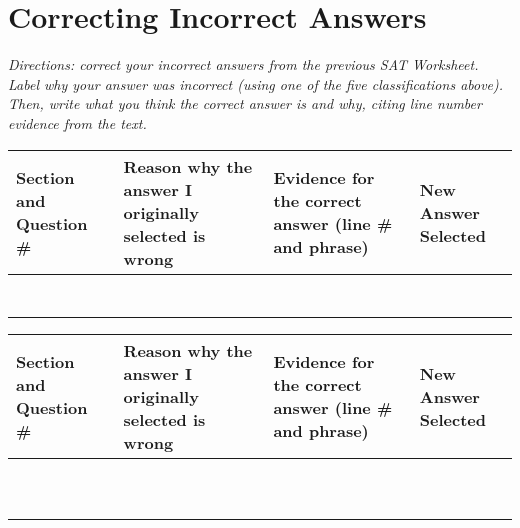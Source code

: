 \section{Correcting Incorrect Answers}

\textit{Directions: correct your incorrect answers from the previous SAT Worksheet. Label why your answer
was incorrect (using one of the five classifications above). Then, write what you think the correct
answer is and why, citing line number evidence from the text.}

\bigskip
\begin{tabularx}{\textwidth}{|X|p{2in}|p{2in}|X|}\hline
Section and Question \# & Reason why the answer I originally selected is wrong & Evidence for the correct answer (line \# and phrase) & New Answer Selected\\\hline
& & &\\[2ex]\hline
& & &\\[2ex]\hline
& & &\\[2ex]\hline
& & &\\[2ex]\hline
& & &\\[2ex]\hline
& & &\\[2ex]\hline
& & &\\[2ex]\hline
\end{tabularx}

\newpage
\begin{tabularx}{\textwidth}{|X|p{2in}|p{2in}|X|}\hline
Section and Question \# & Reason why the answer I originally selected is wrong & Evidence for the correct answer (line \# and phrase) & New Answer Selected\\\hline
& & &\\[2ex]\hline
& & &\\[2ex]\hline
& & &\\[2ex]\hline
& & &\\[2ex]\hline
& & &\\[2ex]\hline
& & &\\[2ex]\hline
& & &\\[2ex]\hline
& & &\\[2ex]\hline
& & &\\[2ex]\hline
& & &\\[2ex]\hline
\end{tabularx}